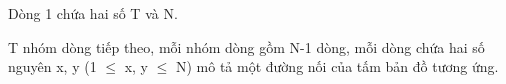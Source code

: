 Dòng 1 chứa hai số T và N.  

   T nhóm dòng tiếp theo, mỗi nhóm dòng gồm N-1 dòng, mỗi dòng chứa hai số nguyên x, y (1  $\le$  x, y  $\le$  N) mô tả một đường nối của tấm bản đồ tương ứng.  

\